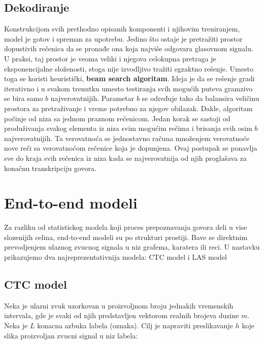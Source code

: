 \documentclass[a4paper]{article}
\begin{document}
\subsection{Dekodiranje}
Konstrukcijom svih prethodno opisanih komponenti i njihovim treniranjem, model je gotov i spreman za upotrebu.
Jedino što ostaje je pretražiti prostor dopustivih rečenica da se pronađe ona koja najviše odgovara glasovnom signalu.
U praksi, taj prostor je veoma veliki i njegova celokupna pretraga je eksponencijalne složenosti, stoga nije izvodljivo tražiti egzaktno rešenje.
Umesto toga se koristi heuristički, \textbf{beam search algoritam}.
Ideja je da se rešenje gradi iterativno i u svakom trenutku umesto testiranja svih mogućih puteva gramzivo se bira samo $b$ najverovatnijih.
Parametar $b$ se određuje tako da balansira veličinu prostora za pretraživanje i vreme potrebno za njegov obilazak.
Dakle, algoritam počinje od niza sa jednom praznom rečenicom.
Jedan korak se sastoji od produživanja svakog elementa iz niza svim mogućim rečima i brisanja svih osim $b$ najverovatnijih.
Ta verovatnoća se jednostavno računa množenjem verovatnoće nove reči sa verovatnoćom rečenice koja je dopunjena.
Ovaj postupak se ponavlja sve do kraja svih rečenica iz niza kada se najverovatnija od njih proglašava za konačnu transkripciju govora.

\section{End-to-end modeli}
\label{sec:e2e}



Za razliku od statistickog modela koji proces prepoznavanja govora deli u vise slozenijih celina, end-to-end modeli su po strukturi prostiji. Bave se direktnim prevodjenjem ulaznog zvucnog signala u niz grafema, karatera ili reci.  U nastavku prikazujemo dva najreprezentativnija modela: CTC model \cite{graves2006ctc} i LAS model \cite{chan2015las} \cite{chorowski2015attentionbased}

\subsection{CTC model}
\label{sec:ctc}

Neka je ulazni zvuk uzorkovan u proizvoljnom broju jednakih vremenskih intervala,  gde je svaki od njih predstavljen vektorom realnih brojeva duzine $m$.  Neka je $L$ konacna azbuka labela (oznaka).  Cilj je napraviti preslikavanje $h$ koje slika proizvoljan zvucni signal u niz labela:
\end{document}
